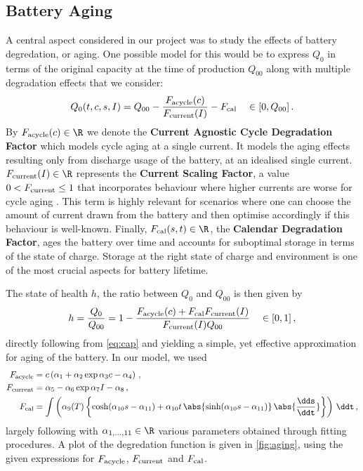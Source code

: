 \documentclass{prettytex/ox/mmsc-special-topic}
\begin{document}
  \subsection{Battery Aging}
  A central aspect considered in our project was to study the effects of battery degredation, or aging. One possible model for this would be to express $Q_0$ in terms of the original capacity at the time of production $Q_{00}$ along with multiple degradation effects that we consider:
  \begin{equation}
    \label{eq:cap}
    Q_0(t,c,s,I) = Q_{00} - \frac{F_{\rm acycle}(c)}{F_{\rm current}(I)} - F_{\rm cal} \quad \in [0, Q_{00}]\,.
  \end{equation}
  By $F_{\rm acycle}(c) \in \R$ we denote the \textbf{Current Agnostic Cycle Degradation Factor} which models cycle aging at a single current. It models the aging effects resulting only from discharge usage of the battery, at an idealised single current.
  $F_{\rm current}(I) \in \R$ represents the \textbf{Current Scaling Factor}, a value $0 < F_{\rm current} \leq 1$ that incorporates behaviour where higher currents are worse for cycle aging \parencite{csfpaper}. This term is highly relevant for scenarios where one can choose the amount of current drawn from the battery and then optimise accordingly if this behaviour is well-known.
  Finally, $F_{\rm cal}(s,t) \in \R$, the \textbf{Calendar Degradation Factor}, ages the battery over time and accounts for suboptimal storage in terms of the state of charge.
  Storage at the right state of charge and environment is one of the most crucial aspects for battery lifetime.

  The state of health $h$, the ratio between $Q_0$ and $Q_{00}$ is then given by
  $$h = \frac{Q_0}{Q_{00}} = 1 - \frac{F_{\rm acycle}(c) + F_{\rm cal} F_{\rm current}(I)}{F_{\rm current}(I) Q_{00}} \quad \in [0, 1]\,,$$
  directly following from \autoref{eq:cap} and yielding a simple, yet effective approximation for aging of the battery.
  In our model, we used
  \begin{align*}
    F_{\rm acycle}  & = c \left( \alpha_1 + \alpha_2 \exp{\alpha_3c-\alpha_4} \right)\,,                                                                                                                     \\
    F_{\rm current} & = \alpha_5 - \alpha_6 \exp{ \alpha_7 I - \alpha_8}\,,                                                                                                                                  \\
    F_{\rm cal}     & = \int \left( \alpha_9(T) \left\{\cosh({\alpha_{10}s - \alpha_{11}}) + \alpha_{10} t \, \abs{\sinh({\alpha_{10} s- \alpha_{11}})} \, \abs{ \frac{\dds}{\ddt}}\right\}\right) \,\ddt\,,
  \end{align*}
  largely following \cite{csfpaper}
  with $\alpha_{1, ..., 11} \in \R$ various parameters obtained through fitting procedures.
  A plot of the degredation function is given in \autoref{fig:aging}, using the given expressions for $F_{\rm acycle}$, $F_{\rm current}$ and $F_{\rm cal}$.
\end{document}
